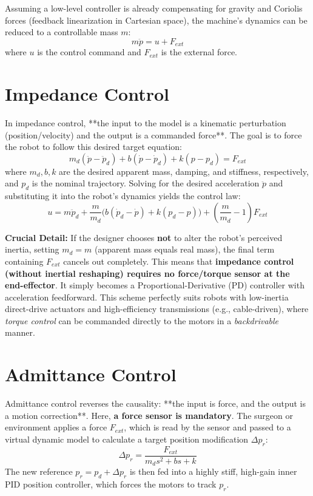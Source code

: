 \documentclass[11pt,a4paper,twoside]{report}
\begin{document}
Assuming a low-level controller is already compensating for gravity and Coriolis forces (feedback linearization in Cartesian space), the machine's dynamics can be reduced to a controllable mass $m$:
\begin{equation}
    m\ddot{p} = u + F_{ext}
\end{equation}
where $u$ is the control command and $F_{ext}$ is the external force.

\section{Impedance Control}
In impedance control, **the input to the model is a kinematic perturbation (position/velocity) and the output is a commanded force**.
The goal is to force the robot to follow this desired target equation:
\begin{equation}
    m_d(\ddot{p} - \ddot{p}_d) + b(\dot{p} - \dot{p}_d) + k(p - p_d) = F_{ext}
\end{equation}
where $m_d, b, k$ are the desired apparent mass, damping, and stiffness, respectively, and $p_d$ is the nominal trajectory.
Solving for the desired acceleration $\ddot{p}$ and substituting it into the robot's dynamics yields the control law:
\begin{equation}
    u = m\ddot{p}_d + \frac{m}{m_d}\Big( b(\dot{p}_d - \dot{p}) + k(p_d - p) \Big) + \left( \frac{m}{m_d} - 1 \right)F_{ext}
\end{equation}

\textbf{Crucial Detail:} If the designer chooses \textbf{not} to alter the robot's perceived inertia, setting $m_d = m$ (apparent mass equals real mass), the final term containing $F_{ext}$ cancels out completely. This means that \textbf{impedance control (without inertial reshaping) requires no force/torque sensor at the end-effector}. It simply becomes a Proportional-Derivative (PD) controller with acceleration feedforward.
This scheme perfectly suits robots with low-inertia direct-drive actuators and high-efficiency transmissions (e.g., cable-driven), where \textit{torque control} can be commanded directly to the motors in a \textit{backdrivable} manner.

\section{Admittance Control}
Admittance control reverses the causality: **the input is force, and the output is a motion correction**.
Here, \textbf{a force sensor is mandatory}. The surgeon or environment applies a force $F_{ext}$, which is read by the sensor and passed to a virtual dynamic model to calculate a target position modification $\Delta p_r$:
\begin{equation}
    \Delta p_r = \frac{F_{ext}}{m_d s^2 + b s + k}
\end{equation}
The new reference $p_r = p_d + \Delta p_r$ is then fed into a highly stiff, high-gain inner PID position controller, which forces the motors to track $p_r$.
\end{document}
